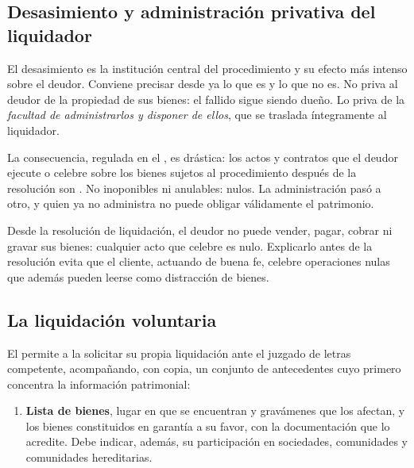 \subsection{Desasimiento y administración privativa del liquidador}

El desasimiento es la institución central del procedimiento y su efecto más intenso sobre
el deudor. Conviene precisar desde ya lo que es y lo que no es. No priva al deudor de la
propiedad de sus bienes: el fallido sigue siendo dueño. Lo priva de la \emph{facultad de
administrarlos y disponer de ellos}, que se traslada íntegramente al liquidador.

La consecuencia, regulada en el , es drástica: los actos y contratos que el deudor
ejecute o celebre sobre los bienes sujetos al procedimiento después de la resolución son
. No inoponibles ni anulables: nulos. La administración pasó a otro, y quien
ya no administra no puede obligar válidamente el patrimonio.

\begin{foco}
Desde la resolución de liquidación, el deudor no puede vender, pagar, cobrar ni gravar sus
bienes: cualquier acto que celebre es nulo. Explicarlo antes de la resolución evita que el
cliente, actuando de buena fe, celebre operaciones nulas que además pueden leerse como
distracción de bienes.
\end{foco}

\bloqueNormativo

\subsection{La liquidación voluntaria}

El  permite a la \empresadeudora{} solicitar su propia liquidación ante el juzgado
de letras competente, acompañando, con copia, un conjunto de antecedentes cuyo primero
concentra la información patrimonial:

\begin{enumerate}
  \item \textbf{Lista de bienes}, lugar en que se encuentran y gravámenes que los afectan,
   y los
  bienes constituidos en garantía a su favor, con la documentación que lo acredite. Debe
  indicar, además, su participación en sociedades, comunidades y comunidades hereditarias.
\end{enumerate}

